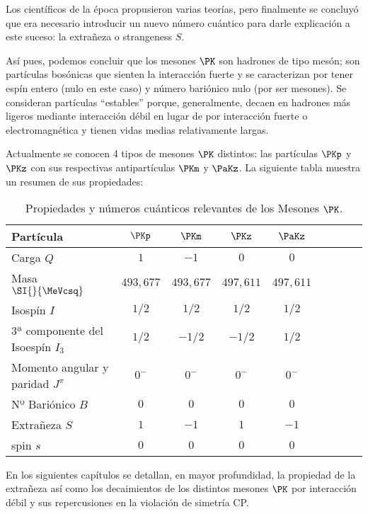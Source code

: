 Los científicos de la época propusieron varias teorías, pero finalmente se concluyó que era necesario introducir un nuevo número cuántico para darle explicación a este suceso: la extrañeza o strangeness $S$. 

Así pues, podemos concluir que los mesones $\PK$ son hadrones de tipo mesón; son partículas bosónicas que sienten la interacción fuerte y se caracterizan por tener espín entero (nulo en este caso) y número bariónico nulo (por ser mesones). Se consideran partículas ``estables'' porque, generalmente, decaen en hadrones más ligeros mediante interacción débil en lugar de por interacción fuerte o electromagnética y tienen vidas medias relativamente largas.

Actualmente se conocen 4 tipos de mesones $\PK$ distintos: las partículas $\PKp$ y $\PKz$ con sus respectivas antipartículas $\PKm$ y $\PaKz$. La siguiente tabla muestra un resumen de sus propiedades:\\

\begin{table}[h]
	\centering
	\begin{tabular}{l*{7}{c}r}
\hline
Partícula & $\PKp$ & $\PKm$ & $\PKz$ & $\PaKz$ \\ 
\hline
Carga $Q$ & $1$ & $-1$ & $0$ & $0$\\
Masa $\SI{}{\MeVcsq}$ & $493,677$ & $493,677$ & $497,611$ & $497,611$\\
Isospín $I$ & $1/2$ & $1/2$ & $1/2$ & $1/2$ \\
3ª componente del Isoespín $I_3$ & $1/2$ & $-1/2$ & $-1/2$ & $1/2$ \\
Momento angular y paridad $J^\pi$ & $0^-$ & $0^-$ & $0^-$ & $0^-$ \\
Nº Bariónico $B$ & $0$ & $0$ & $0$ & $0$\\
Extrañeza $S$ & $1$ & $-1$ & $1$ & $-1$\\
spin $s$ & $0$ & $0$ & $0$ & $0$\\ 
\hline
	\end{tabular}
\caption[Propiedades y números cuánticos relevantes de los Mesones $\PK$]{Propiedades y números cuánticos relevantes de los Mesones $\PK$.\protect\footnotemark}
\label{tab:propiedades}
\end{table}


En los siguientes capítulos se detallan, en mayor profundidad, la propiedad de la extrañeza así como los decaimientos de los distintos mesones $\PK$ por interacción débil y sus repercusiones en la violación de simetría CP.
